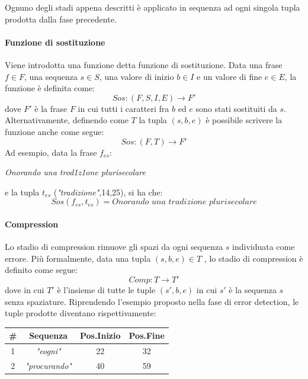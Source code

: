 Ognuno degli stadi appena descritti è applicato in sequenza ad ogni singola tupla prodotta dalla fase precedente.

\paragraph{Funzione di sostituzione}
Viene introdotta una funzione detta funzione di sostituzione. Data una frase $f \in F$, una sequenza $s \in S$, una valore di inizio $b \in I$ e un valore di fine $e \in E$, la funzione è definita come:
\begin{equation}
\textit{Sos}: (F,S,I,E) \rightarrow F\prime
\end{equation}
dove $F\prime$ è la frase $F$ in cui tutti i caratteri fra $b$ ed $e$ sono stati sostituiti da $s$.\\
Alternativamente, definendo come $T$ la tupla $(s,b,e)$ è possibile scrivere la funzione anche come segue:
\begin{equation}
\textit{Sos}: (F,T) \rightarrow F\prime
\end{equation}
Ad esempio, data la frase $f_{es}$:
\begin{center}
\textit{Onorando una trod1z1one plurisecolare}
\end{center}
e la tupla $t_{es}$ (\textit{"tradizione"},14,25), si ha che:
\begin{equation}
\textit{Sos}(f_{es},t_{es}) = \textit{Onorando una tradizione plurisecolare}
\end{equation}


\paragraph{Compression}
Lo stadio di compression rimuove gli spazi da ogni sequenza $s$ individuata come errore. Più formalmente, data una tupla $(s,b,e) \in T$ , lo stadio di compression è definito come segue:
\begin{equation}
\textit{Comp}: T \rightarrow T\prime
\end{equation}
dove in cui $T\prime$ è l'insieme di tutte le tuple $(s\prime,b,e)$ in cui $s\prime$ è la sequenza $s$ senza spaziature. Riprendendo l'esempio proposto nella fase di error detection, le tuple prodotte diventano rispettivamente:
\begin{table}[H]
\centering
\begin{tabular}{cccc}
\#&\textbf{Sequenza} & \textbf{Pos.Inizio} & \textbf{Pos.Fine}\\ \hline
1&\textit{"eogni"}&22& 32\\
2&\textit{"procurando"}& 40& 59\\
\end{tabular}
\end{table}

